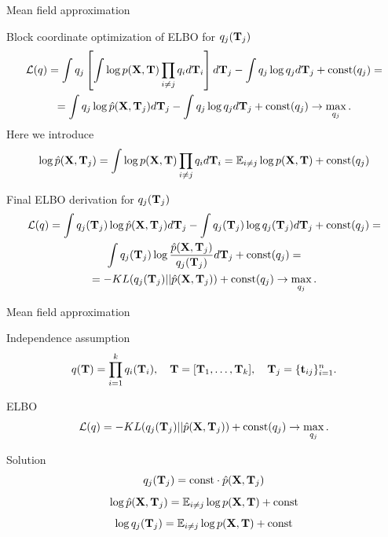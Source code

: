 \documentclass{beamer}
\begin{document}
\begin{frame}{Mean field approximation}
	\footnotesize
	\begin{block}{Block coordinate optimization of ELBO for $q_j(\mathbf{T}_j)$}
		\vspace{-0.4cm}
	    \begin{multline*}
			\mathcal{L} (q) 
			= \int q_j \left[\int \log p(\mathbf{X}, \mathbf{T}) \prod_{i \neq j} q_i d \mathbf{T}_i \right] d \mathbf{T}_j
			- \int q_j \log q_j  d\mathbf{T}_j + \text{const}(q_j) = \\
			= \int q_j \log \hat{p}(\mathbf{X}, \mathbf{T}_j) d \mathbf{T}_j 
			- \int q_j \log q_j d\mathbf{T}_j + \text{const}(q_j) \rightarrow \max_{q_j}.
		\end{multline*}
		Here we introduce
		\[
		   \log \hat{p}(\mathbf{X}, \mathbf{T}_j) = \int \log p(\mathbf{X}, \mathbf{T}) \prod_{i \neq j} q_i d \mathbf{T}_i = \mathbb{E}_{i \neq j} \log p(\mathbf{X}, \mathbf{T}) + \text{const}(q_j)
		\]
	    \end{block}
	    \vspace{-0.3cm}
	    \begin{block}{Final ELBO derivation for $q_j(\mathbf{T}_j)$}
	    	\vspace{-0.5cm}
			\begin{multline*}
	    		\mathcal{L} (q)
	    		= \int q_j (\mathbf{T}_j) \log \hat{p}(\mathbf{X}, \mathbf{T}_j) d \mathbf{T}_j - \int q_j(\mathbf{T}_j) \log q_j(\mathbf{T}_j) d\mathbf{T}_j + \text{const}(q_j) = \\
	    		 \int q_j (\mathbf{T}_j) \log \frac{\hat{p}(\mathbf{X}, \mathbf{T}_j)}{q_j(\mathbf{T}_j)} d\mathbf{T}_j + \text{const}(q_j) = \\
	    		= - KL (q_j(\mathbf{T}_j) || \hat{p}(\mathbf{X}, \mathbf{T}_j)) + \text{const}(q_j) \rightarrow \max_{q_j}.
	    	\end{multline*}
	    \end{block}
\end{frame}
\begin{frame}{Mean field approximation}   
	 \begin{block}{Independence assumption}
		\vspace{-0.3cm}
		\[
		q(\mathbf{T}) = \prod_{i=1}^k q_i(\mathbf{T}_i), \quad \mathbf{T} = [\mathbf{T}_1, \dots, \mathbf{T}_k], \quad \mathbf{T}_j = \{ \mathbf{t}_{ij}\}_{i=1}^n.
		\]
		\vspace{-0.3cm}
	\end{block}
	\begin{block}{ELBO}
	    \[
			\mathcal{L} (q) = - KL (q_j(\mathbf{T}_j) || \hat{p}(\mathbf{X}, \mathbf{T}_j))  + \text{const}(q_j) \rightarrow \max_{q_j}.
	    \]
	    \vspace{-0.3cm}
	\end{block}
	 \begin{block}{Solution}
	 	\vspace{-0.3cm}
		 \[
		    q_j(\mathbf{T}_j) = \text{const} \cdot \hat{p}(\mathbf{X}, \mathbf{T}_j)
		 \]
		 \[
		 	\log \hat{p}(\mathbf{X}, \mathbf{T}_j) = \mathbb{E}_{i \neq j} \log p(\mathbf{X}, \mathbf{T}) + \text{const}
		 \]
		 \[
		     \log q_j(\mathbf{T}_j) = \mathbb{E}_{i \neq j} \log p(\mathbf{X}, \mathbf{T}) + \text{const}
		 \]
		 \vspace{-0.3cm}
	 \end{block}
\end{frame}
\end{document}
